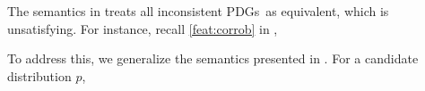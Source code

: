 \documentclass{article}
\newcommand{\V}{\mathcal V}
\newcommand{\MN}{PDG}
\newcommand{\MNs}{\MN s}
\numberwithin{equation}{section}
\begin{document}
        The semantics in  treats all inconsistent \MNs\ as equivalent, which is unsatisfying. 
		For instance, recall \cref{feat:corrob} in , 
		
 		To address this, we generalize the semantics presented in . For a candidate distribution $p$,
\end{document}
